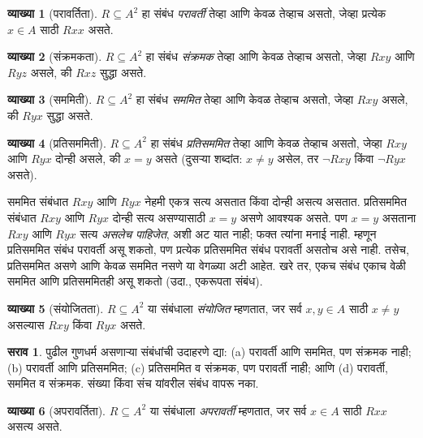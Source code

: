 \documentclass[11pt,a4paper,openany]{book}
\theoremstyle{definition}
\newtheorem{defn}{व्याख्या}[section]
\newtheorem{prob}{सराव}[chapter]
\newenvironment{explain}{}{}
\begin{document}
\begin{defn}[परावर्तिता]
$R \subseteq A^2$ हा संबंध \emph{परावर्ती} तेव्हा आणि केवळ तेव्हाच असतो,
जेव्हा प्रत्येक $x \in A$ साठी $Rxx$ असते.
\end{defn}

\begin{defn}[संक्रमकता]
$R \subseteq A^2$ हा संबंध \emph{संक्रमक} तेव्हा आणि केवळ तेव्हाच असतो,
जेव्हा $Rxy$ आणि $Ryz$ असले, की $Rxz$ सुद्धा असते.
\end{defn}

\begin{defn}[सममिती]
$R \subseteq A^2$ हा संबंध \emph{सममित} तेव्हा आणि केवळ तेव्हाच असतो,
जेव्हा $Rxy$ असले, की $Ryx$ सुद्धा असते.
\end{defn}

\begin{defn}[प्रतिसममिती]
$R \subseteq A^2$ हा संबंध \emph{प्रति\-सम\-मित} तेव्हा आणि केवळ तेव्हाच
असतो, जेव्हा $Rxy$ आणि $Ryx$ दोन्ही असले, की $x=y$ असते (दुसऱ्या शब्दांत:
$x\neq y$ असेल, तर $\lnot Rxy$ किंवा $\lnot Ryx$ असते).
\end{defn}

\begin{explain}
सममित संबंधात $Rxy$ आणि $Ryx$ नेहमी एकत्र सत्य असतात किंवा दोन्ही असत्य
असतात. प्रतिसममित संबंधात $Rxy$ आणि $Ryx$ दोन्ही सत्य असण्यासाठी $x = y$
असणे आवश्यक असते. पण $x = y$ असताना $Rxy$ आणि $Ryx$ सत्य \emph{असलेच
पाहिजेत}, अशी अट यात नाही; फक्त त्यांना मनाई नाही. म्हणून प्रतिसममित
संबंध परावर्ती असू शकतो, पण प्रत्येक प्रतिसममित संबंध परावर्ती असतोच
असे नाही. तसेच, प्रतिसममित असणे आणि केवळ सममित नसणे या वेगळ्या अटी आहेत.
खरे तर, एकच संबंध एकाच वेळी सममित आणि प्रतिसममितही असू शकतो
(उदा., एकरूपता संबंध).
\end{explain}

\begin{defn}[संयोजितता]
$R \subseteq A^2$ या संबंधाला \emph{संयोजित} म्हणतात, जर सर्व $x,y\in A$
साठी $x \neq y$ असल्यास $Rxy$ किंवा $Ryx$ असते.
\end{defn}

\begin{prob}
पुढील गुणधर्म असणाऱ्या संबंधांची उदाहरणे द्या: (a) परावर्ती आणि सममित,
पण संक्रमक नाही; (b) परावर्ती आणि प्रतिसममित; (c) प्रतिसममित व संक्रमक,
पण परावर्ती नाही; आणि (d) परावर्ती, सममित व संक्रमक. संख्या किंवा संच
यांवरील संबंध वापरू नका.
\end{prob}

\begin{defn}[अपरावर्तिता]
$R \subseteq A^2$ या संबंधाला \emph{अपरावर्ती} म्हणतात, जर सर्व $x \in A$
साठी $Rxx$ असत्य असते.
\end{defn}
\end{document}
